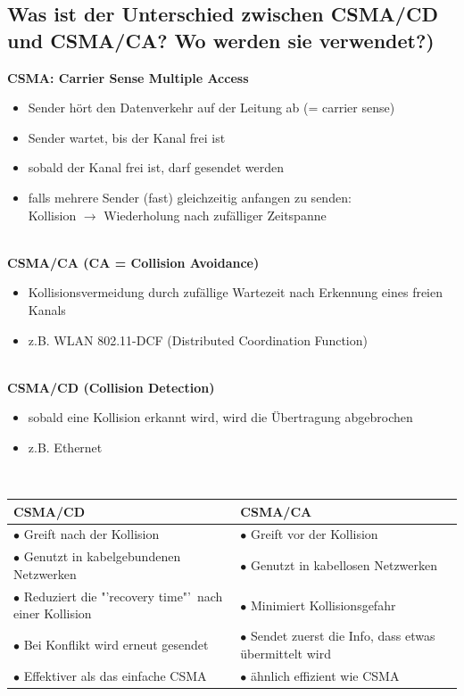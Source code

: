 \subsection*{Was ist der Unterschied zwischen CSMA/CD und CSMA/CA? Wo werden sie verwendet?)}\label{sub:csma}
\textbf{CSMA: Carrier Sense Multiple Access}
\begin{itemize}
    \item Sender hört den Datenverkehr auf der Leitung ab (= carrier sense)
    \item Sender wartet, bis der Kanal frei ist
    \item sobald der Kanal frei ist, darf gesendet werden
    \item falls mehrere Sender (fast) gleichzeitig anfangen zu senden:\\Kollision $\rightarrow$ Wiederholung nach zufälliger Zeitspanne
\end{itemize}\,\\

\textbf{CSMA/CA (CA = Collision Avoidance)}
\begin{itemize}
    \item Kollisionsvermeidung durch zufällige Wartezeit nach Erkennung eines freien Kanals
    \item z.B. WLAN 802.11-DCF (Distributed Coordination Function)
\end{itemize}\,\\

\textbf{CSMA/CD (Collision Detection)}
\begin{itemize}
    \item sobald eine Kollision erkannt wird, wird die Übertragung abgebrochen
    \item z.B. Ethernet
\end{itemize}\,\\

\begin{tabularx}{\textwidth}{X|X}
    \multicolumn{1}{X}{CSMA/CD}&\multicolumn{1}{X}{CSMA/CA}\\
    \hline
    $\bullet$ Greift nach der Kollision&$\bullet$ Greift vor der Kollision\\
    $\bullet$ Genutzt in kabelgebundenen Netzwerken&$\bullet$ Genutzt in kabellosen Netzwerken\\
    $\bullet$ Reduziert die "'recovery time"' nach einer Kollision&$\bullet$ Minimiert Kollisionsgefahr\\
    $\bullet$ Bei Konflikt wird erneut gesendet&$\bullet$ Sendet zuerst die Info, dass etwas übermittelt wird\\
    $\bullet$ Effektiver als das einfache CSMA&$\bullet$ ähnlich effizient wie CSMA\\
\end{tabularx}

